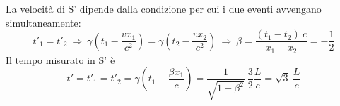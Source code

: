\documentclass[12pt,twoside,a4]{article}
\begin{document}
\begin{solution}
	 La velocità di S' dipende dalla condizione per cui i due eventi avvengano simultaneamente:  
 \begin{equation*}
     t'_1 = t'_2   \  \Rightarrow  \  \gamma \left(t_1 - \frac{v x_1}{c^2} \right)= \gamma \left(t_2 -\frac{v x_2}{c^2} \right)   \   \Rightarrow  \  \beta = \frac{(t_1 -t_2) \ c}{x_1 -x_2} = -\frac{1}{2} 
 \end{equation*}Il tempo misurato in S' è 
        \begin{equation*}
        t' = t'_1 = t'_2 = \gamma \left(t_1 -\frac{\beta x_1}{c}\right) = \frac{1}{\sqrt{1-\beta^2}} \ \frac{3}{2} \frac{L}{c} = \sqrt{3} \ \frac{L}{c} 
         \end{equation*}
\end{solution}
\end{document}
